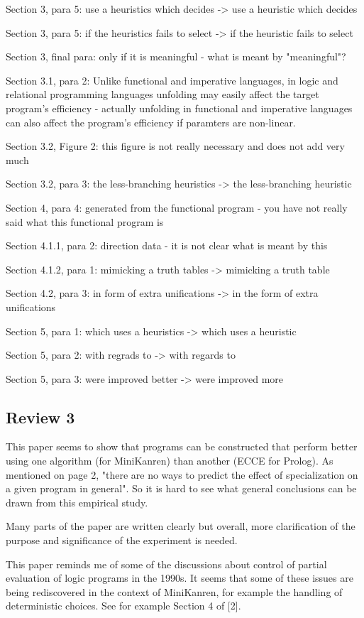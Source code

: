 Section 3, para 5: use a heuristics which decides ->  use a heuristic which decides

Section 3, para 5: if the heuristics fails to select -> if the heuristic fails to select

Section 3, final para: only if it is meaningful - what is meant by "meaningful"?

Section 3.1, para 2: Unlike functional and imperative languages, in logic and relational programming languages unfolding
may easily affect the target program’s efficiency - actually unfolding in functional and imperative languages can also
affect the program's efficiency if paramters are non-linear.

Section 3.2, Figure 2: this figure is not really necessary and does not add very much

Section 3.2, para 3: the less-branching heuristics -> the less-branching heuristic

Section 4, para 4: generated from the functional program - you have not really said what this functional program is

Section 4.1.1, para 2: direction data - it is not clear what is meant by this

Section 4.1.2, para 1: mimicking a truth tables -> mimicking a truth table

Section 4.2, para 3: in form of extra unifications -> in the form of extra unifications

Section 5, para 1: which uses a heuristics -> which uses a heuristic

Section 5, para 2: with regrads to -> with regards to

Section 5, para 3: were improved better -> were improved more

\subsection*{Review 3}

This paper seems to show that programs can be constructed that perform better using one algorithm (for MiniKanren) than another (ECCE for Prolog).  As mentioned on page 2, "there are no ways to predict the effect of specialization on a given program in general".  So it is hard to see what general conclusions can be drawn from this empirical study.

Many parts of the paper are written clearly but overall, more clarification of the purpose and significance of the experiment is needed.

This paper reminds me of some of the discussions about control of partial evaluation of logic programs in the 1990s.  It seems that some of these issues are being rediscovered in the context of MiniKanren, for example the handling of deterministic choices.  See for example Section 4 of [2].

